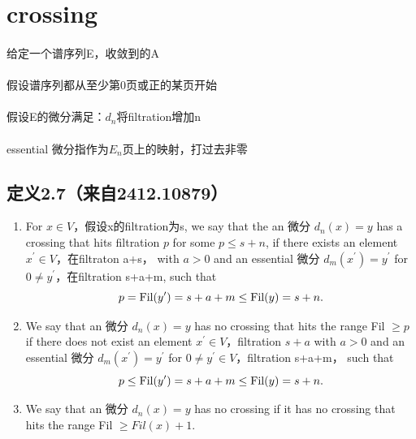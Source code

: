 \documentclass[12pt]{article}
\begin{document}
\sffamily
\huge

\section{crossing}
\paragraph{}给定一个谱序列E，收敛到的A
\paragraph{}假设谱序列都从至少第0页或正的某页开始
\paragraph{}假设E的微分满足：$d_n$将filtration增加n

\paragraph{}essential 微分指作为$E_n$页上的映射，打过去非零

\subsection{定义2.7（来自2412.10879）}

\begin{enumerate}
    \item For $x\in V$，假设x的filtration为s, we say that the an 微分 $d_n(x)=y$ has a crossing that hits filtration $p$ for some $p \leq s+n$, if there exists an element $x^\prime\in V$，在filtraton a+s， with $a>0$ and an essential 微分 $d_m(x^\prime)=y^\prime$ for $0\neq y^\prime$，在filtration s+a+m, such that
    $$p = \textup{Fil}(y^\prime) = s+a+m\le \textup{Fil}(y) = s+n.$$
    \item We say that an 微分 $d_n(x)=y$ has no crossing that hits the range Fil $\ge p$ if there does not exist an element $x^\prime\in V$，filtration $s+a$ with $a>0$ and an essential 微分 $d_m(x^\prime)=y^\prime$ for $0\neq y^\prime\in V$，filtration s+a+m， such that
    $$p\le \textup{Fil}(y^\prime) = s+a+m\le \textup{Fil}(y) = s+n.$$
    \item We say that an 微分 $d_n(x)=y$ has no crossing if it has no crossing that hits the range Fil $\ge Fil(x) + 1$.
\end{enumerate}
\end{document}
